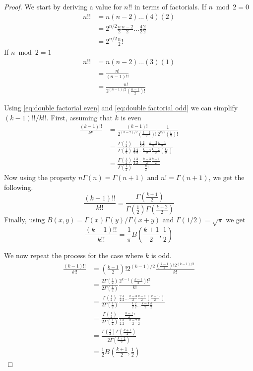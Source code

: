 \documentclass{article}
\begin{document}
\begin{proof}
	We start by deriving a value for $n!!$ in terms of factorials. If $n\bmod 2 = 0$
	\begin{align}
		n!! &= n(n-2)\hdots(4)(2) \\
		&= 2^{n/2}\frac{n}{2}\frac{n-2}{2}\hdots\frac{4}{2}\frac{2}{2} \\
		&= 2^{n/2}\frac{n}{2}! \label{eq:double factorial even}
	\end{align}
	If $n\bmod 2= 1$
	\begin{align}
		n!! &= n(n-2)\hdots(3)(1) \\
		&= \frac{n!}{(n-1)!!} \\
		&= \frac{n!}{2^{(n-1)/2}(\frac{n-1}{2})!} \label{eq:double factorial odd}
	\end{align}

	Using \ref{eq:double factorial even} and \ref{eq:double factorial odd} we can simplify $(k-1)!!/k!!$. First, assuming that $k$ is even
	\begin{align}
		\frac{(k-1)!!}{k!!} &= \frac{(k-1)!}{2^{(k-2)/2}(\frac{k-2}{2})!}\frac{1}{2^{k/2}(\frac{k}{2})!} \\
		&= \frac{\Gamma(\frac{1}{2})}{\Gamma(\frac{1}{2})}\frac{\frac{1}{2}\frac{2}{2}\hdots\frac{k-2}{2}\frac{k-1}{2}}{\frac{2}{2}\frac{4}{2}\hdots\frac{k-4}{2}\frac{k-2}{2}(\frac{k}{2}!)} \\
		&= \frac{\Gamma(\frac{1}{2})}{\Gamma(\frac{1}{2})}\frac{\frac{1}{2}\frac{3}{2}\hdots\frac{k-3}{2}\frac{k-1}{2}}{\frac{k}{2}!}
	\end{align}
	Now using the property $n\Gamma(n)=\Gamma(n+1)$ and $n! = \Gamma(n+1)$, we get the following.
	\begin{equation}
		\frac{(k-1)!!}{k!!} = \frac{\Gamma(\frac{k+1}{2})}{\Gamma(\frac{1}{2})\Gamma(\frac{k+2}{2})}
	\end{equation}
	Finally, using $B(x,y)=\Gamma(x)\Gamma(y)/\Gamma(x+y)$ and $\Gamma(1/2) = \sqrt{\pi}$ we get
	\begin{equation}
		\frac{(k-1)!!}{k!!} = \frac{1}{\pi}B\left(\frac{k+1}{2}, \frac{1}{2}\right)
	\end{equation}

	We now repeat the process for the case where $k$ is odd.
	\begin{align}
		\frac{(k-1)!!}{k!!} &= \left(\frac{k-1}{2}\right)!2^{(k-1)/2}\frac{(\frac{k-1}{2})!2^{(k-1)/2}}{k!} \\
		&= \frac{2\Gamma(\frac{1}{2})}{2\Gamma(\frac{1}{2})}\frac{2^{k-1}(\frac{k-1}{2})!^2}{k!} \\
		&= \frac{\Gamma(\frac{1}{2})}{2\Gamma(\frac{1}{2})}\frac{\frac{2}{2}\frac{4}{2}\hdots\frac{k-3}{2}\frac{k-1}{2}(\frac{k-1}{2}!)}{\frac{1}{2}\frac{2}{2}\hdots\frac{k-1}{2}\frac{k}{2}} \\
		&= \frac{\Gamma(\frac{1}{2})}{2\Gamma(\frac{1}{2})}\frac{\frac{k-1}{2}!}{\frac{1}{2}\frac{3}{2}\hdots\frac{k-2}{2}\frac{k}{2}} \\
		&= \frac{\Gamma(\frac{1}{2})\Gamma(\frac{k+1}{2})}{2\Gamma(\frac{k+2}{2})} \\
		&= \frac{1}{2}B\left(\frac{k+1}{2}, \frac{1}{2}\right)
	\end{align}
\end{proof}
\end{document}
